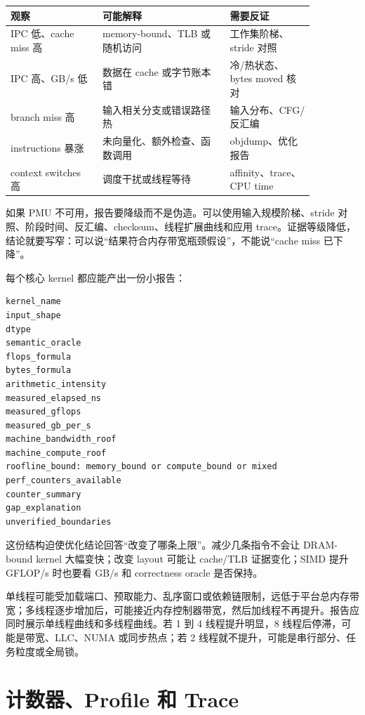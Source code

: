 \begin{center}
\begin{tabular}{p{0.26\linewidth}p{0.36\linewidth}p{0.24\linewidth}}
\toprule
观察 & 可能解释 & 需要反证 \\
\midrule
IPC 低、cache miss 高 & memory-bound、TLB 或随机访问 & 工作集阶梯、stride 对照 \\
IPC 高、GB/s 低 & 数据在 cache 或字节账本错 & 冷/热状态、bytes moved 核对 \\
branch miss 高 & 输入相关分支或错误路径热 & 输入分布、CFG/反汇编 \\
instructions 暴涨 & 未向量化、额外检查、函数调用 & objdump、优化报告 \\
context switches 高 & 调度干扰或线程等待 & affinity、trace、CPU time \\
\bottomrule
\end{tabular}
\end{center}

如果 PMU 不可用，报告要降级而不是伪造。可以使用输入规模阶梯、stride 对照、阶段时间、反汇编、checksum、线程扩展曲线和应用 trace。证据等级降低，结论就要写窄：可以说“结果符合内存带宽瓶颈假设”，不能说“cache miss 已下降”。

每个核心 kernel 都应能产出一份小报告：

\begin{lstlisting}[numbers=none,caption={RooflineReport 最小字段}]
kernel_name
input_shape
dtype
semantic_oracle
flops_formula
bytes_formula
arithmetic_intensity
measured_elapsed_ns
measured_gflops
measured_gb_per_s
machine_bandwidth_roof
machine_compute_roof
roofline_bound: memory_bound or compute_bound or mixed
perf_counters_available
counter_summary
gap_explanation
unverified_boundaries
\end{lstlisting}

这份结构迫使优化结论回答“改变了哪条上限”。减少几条指令不会让 DRAM-bound kernel 大幅变快；改变 layout 可能让 cache/TLB 证据变化；SIMD 提升 GFLOP/s 时也要看 GB/s 和 correctness oracle 是否保持。

单线程可能受加载端口、预取能力、乱序窗口或依赖链限制，远低于平台总内存带宽；多线程逐步增加后，可能接近内存控制器带宽，然后加线程不再提升。报告应同时展示单线程曲线和多线程曲线。若 1 到 4 线程提升明显，8 线程后停滞，可能是带宽、LLC、NUMA 或同步热点；若 2 线程就不提升，可能是串行部分、任务粒度或全局锁。

\section{计数器、Profile 和 Trace}

